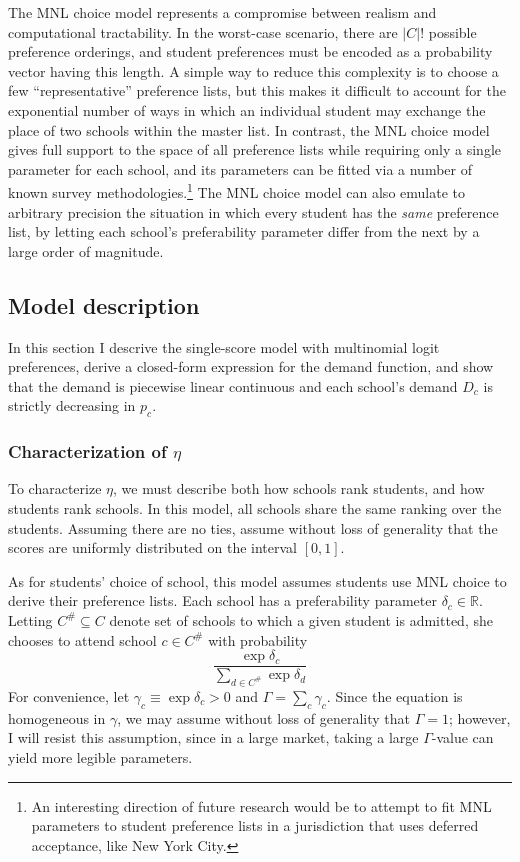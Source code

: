 \documentclass[12pt]{article}
\theoremstyle{definition}
\begin{document}
The MNL choice model represents a compromise between realism and computational tractability. In the worst-case scenario, there are $|C|!$ possible preference orderings, and student preferences must be encoded as a probability vector having this length. A simple way to reduce this complexity is to choose a few ``representative'' preference lists, but this makes it difficult to account for the exponential number of ways in which an individual student may exchange the place of two schools within the master list. In contrast, the MNL choice model gives full support to the space of all preference lists while requiring only a single parameter for each school, and its parameters can be fitted via a number of known survey methodologies.\footnote{An interesting direction of future research would be to attempt to fit MNL parameters to student preference lists in a jurisdiction that uses deferred acceptance, like New York City.} The MNL choice model can also emulate to arbitrary precision the situation in which every student has the \emph{same} preference list, by letting each school's preferability parameter differ from the next by a large order of magnitude. 


\subsection{Model description} 

In this section I descrive the single-score model with multinomial logit preferences, derive a closed-form expression for the demand function, and show that the demand is piecewise linear continuous and each school's demand $D_c$ is strictly decreasing in $p_c$. 

\subsubsection{Characterization of $\eta$}
To characterize $\eta$, we must describe both how schools rank students, and how students rank schools. In this model, all schools share the same ranking over the students. Assuming there are no ties, assume without loss of generality that the scores are uniformly distributed on the interval $[0,1]$. 

As for students' choice of school, this model assumes students use MNL choice to derive their preference lists. Each school has a preferability parameter $\delta_c \in \mathbb{R}$. Letting $C^\# \subseteq C$ denote set of schools to which a given student is admitted, she chooses to attend school $c \in C^\#$ with probability
\[\frac{\exp \delta_c}{\sum_{d \in C^\#} \exp \delta_d}\]
For convenience, let $\gamma_c \equiv \exp \delta_c > 0$ and $\Gamma = \sum_c \gamma_c$. Since the equation is homogeneous in $\gamma$, we may assume without loss of generality that $\Gamma = 1$; however, I will resist this assumption, since in a large market, taking a large $\Gamma$-value can yield more legible parameters. 
\end{document}
